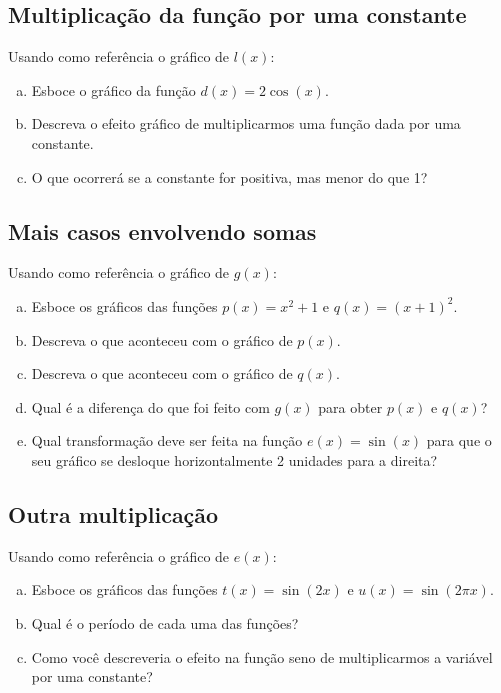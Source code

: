 \documentclass[main_estudante.tex]{subfiles}
\begin{document}
\subsection*{Multiplicação da função por uma constante}

\begin{questao}
Usando como referência o gráfico de $l(x)$:
\begin{enumerate}[a)]
\item Esboce o gráfico da função $d(x)=2\cos(x)$.
\item Descreva o efeito gráfico de multiplicarmos uma função dada por uma constante.
\item O que ocorrerá se a constante for positiva, mas menor do que 1?
\end{enumerate}
\end{questao}

\subsection*{Mais casos envolvendo somas}

\begin{questao}
Usando como referência o gráfico de $g(x)$:
\begin{enumerate}[a)]
\item Esboce os gráficos das funções $p(x)=x^2+1$ e $q(x)=(x+1)^2$.
\item Descreva o que aconteceu com o gráfico de $p(x)$.
\item Descreva o que aconteceu com o gráfico de $q(x)$.
\item Qual é a diferença do que foi feito com $g(x)$ para obter $p(x)$ e $q(x)$?
\item Qual transformação deve ser feita na função $e(x)=\sin(x)$ para que o seu gráfico se desloque horizontalmente 2 unidades para a direita?
\end{enumerate}
\end{questao}

\subsection*{Outra multiplicação}

\begin{questao}
Usando como referência o gráfico de $e(x)$:
\begin{enumerate}[a)]
\item Esboce os gráficos das funções $t(x)=\sin(2x)$ e $u(x)=\sin(2\pi x)$.
\item Qual é o período de cada uma das funções?
\item Como você descreveria o efeito na função seno de multiplicarmos a variável por uma constante?
\end{enumerate}
\end{questao}
\end{document}
